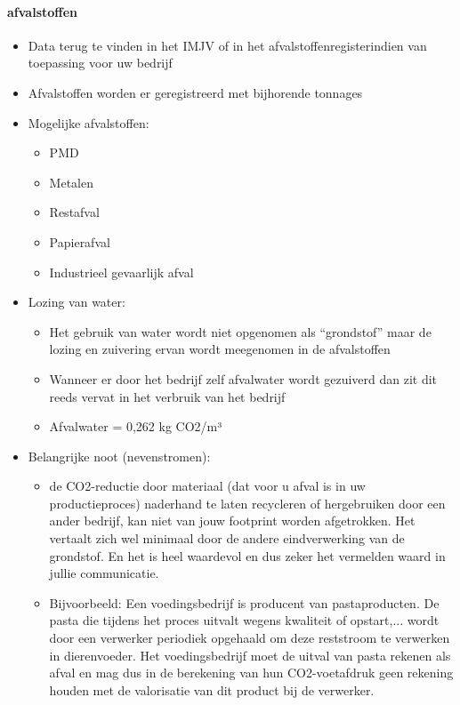\documentclass[12pt]{article}
\begin{document}
\paragraph{afvalstoffen}
\begin{itemize}
    \item Data terug te vinden in het IMJV of in het afvalstoffenregisterindien van toepassing voor
    uw bedrijf
    \item Afvalstoffen worden er geregistreerd met bijhorende tonnages
    \item Mogelijke afvalstoffen:\begin{itemize}
        \item PMD
        \item Metalen 
        \item Restafval 
        \item Papierafval 
        \item Industrieel gevaarlijk afval
    \end{itemize}
    \item Lozing van water:\begin{itemize}
        \item Het gebruik van water wordt niet opgenomen als “grondstof”
        maar de lozing en zuivering ervan wordt meegenomen in de
        afvalstoffen 
        \item Wanneer er door het bedrijf zelf afvalwater wordt gezuiverd dan
        zit dit reeds vervat in het verbruik van het bedrijf
        \item Afvalwater = 0,262 kg CO2/m³
    \end{itemize}
    \item Belangrijke noot (nevenstromen):\begin{itemize}
        \item de CO2-reductie door materiaal (dat voor u afval is in uw
        productieproces) naderhand te laten recycleren of
        hergebruiken door een ander bedrijf, kan niet van jouw
        footprint worden afgetrokken. Het vertaalt zich wel minimaal
        door de andere eindverwerking van de grondstof. En het is heel
        waardevol en dus zeker het vermelden waard in jullie
        communicatie.
        \item Bijvoorbeeld: Een voedingsbedrijf is producent van
        pastaproducten. De pasta die tijdens het proces uitvalt wegens
        kwaliteit of opstart,... wordt door een verwerker periodiek
        opgehaald om deze reststroom te verwerken in dierenvoeder.
        Het voedingsbedrijf moet de uitval van pasta rekenen als afval
        en mag dus in de berekening van hun CO2-voetafdruk geen
        rekening houden met de valorisatie van dit product bij de
        verwerker.        
    \end{itemize}
\end{itemize}
\end{document}
